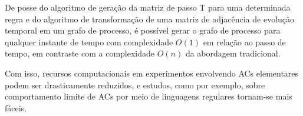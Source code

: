 \documentclass[a4,11pt]{article}
\begin{document}
De posse do algoritmo de geração da matriz de passo T para uma
determinada regra e do algoritmo de transformação de uma matriz de
adjacência de evolução temporal em um grafo de processo, é possível
gerar o grafo de processo para qualquer instante de tempo com complexidade
$O(1)$ em relação ao passo de tempo, em contraste com a complexidade
$O(n)$ da abordagem tradicional.

Com isso, recursos computacionais em experimentos envolvendo ACs
elementares podem ser drasticamente reduzidos, e estudos,
como por exemplo, sobre comportamento limite de ACs por meio de linguagens
regulares tornam-se mais fáceis.



\end{document}
